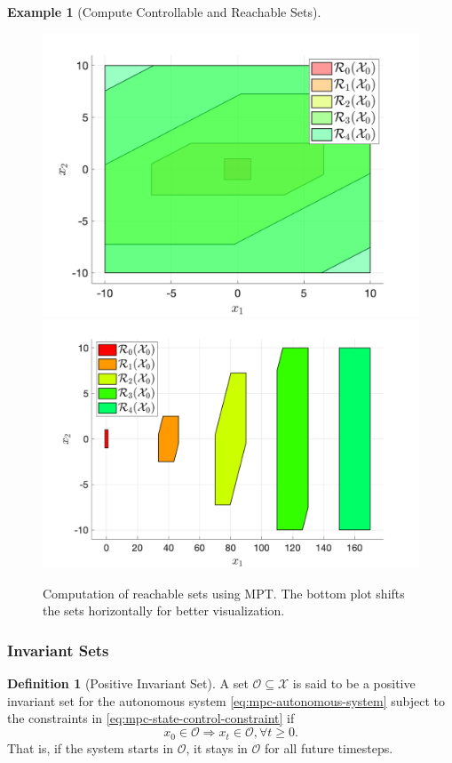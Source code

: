 \documentclass[
]{book}
\theoremstyle{definition}
\newtheorem{definition}{Definition}[chapter]
\theoremstyle{definition}
\newtheorem{example}{Example}[chapter]
\theoremstyle{definition}
\theoremstyle{definition}
\theoremstyle{remark}
\begin{document}
\begin{example}[Compute Controllable and Reachable Sets]
\begin{figure}
{\centering \includegraphics[width=0.6\linewidth]{images/reachable_set_overlap} \includegraphics[width=0.6\linewidth]{images/reachable_set_shift} 

}

\caption{Computation of reachable sets using MPT. The bottom plot shifts the sets horizontally for better visualization.}\label{fig:reachable-set-example}
\end{figure}

\end{example}

\hypertarget{invariant-sets}{%
\subsubsection{Invariant Sets}\label{invariant-sets}}

\begin{definition}[Positive Invariant Set]
\protect\hypertarget{def:positive-invariant-set}{}\label{def:positive-invariant-set}A set \(\mathcal{O} \subseteq \mathcal{X}\) is said to be a positive invariant set for the autonomous system \eqref{eq:mpc-autonomous-system} subject to the constraints in \eqref{eq:mpc-state-control-constraint} if
\[
x_0 \in \mathcal{O} \Longrightarrow x_t \in \mathcal{O}, \forall t \geq 0.
\]
That is, if the system starts in \(\mathcal{O}\), it stays in \(\mathcal{O}\) for all future timesteps.
\end{definition}
\end{document}
